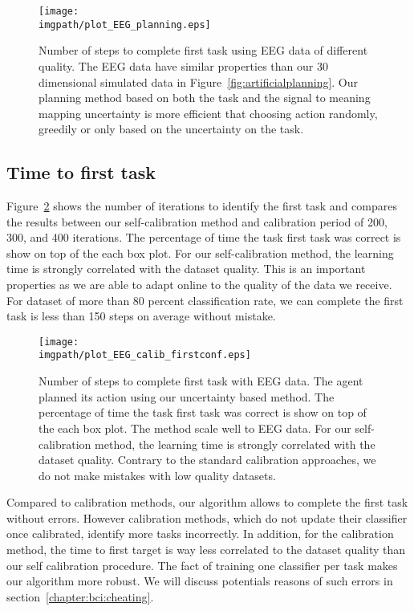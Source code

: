 \begin{figure}[!htbp]
    \centering
    \texttt{[image: \\imgpath/plot\_EEG\_planning.eps]}
    \caption{Number of steps to complete first task using EEG data of different quality. The EEG data have similar properties than our 30 dimensional simulated data in Figure~\ref{fig:artificialplanning}. Our planning method based on both the task and the signal to meaning mapping uncertainty is more efficient that choosing action randomly, greedily or only based on the uncertainty on the task.}
    \label{fig:planningEEG}
\end{figure}

\subsection{Time to first task}

Figure~\ref{fig:firstEEG} shows the number of iterations to identify the first task and compares the results between our self-calibration method and calibration period of 200, 300, and 400 iterations. The percentage of time the task first task was correct is show on top of the each box plot. For our self-calibration method, the learning time is strongly correlated with the dataset quality. This is an important properties as we are able to adapt online to the quality of the data we receive. For dataset of more than 80 percent classification rate, we can complete the first task is less than 150 steps on average without mistake.

\begin{figure}[!htbp]
\centering
\texttt{[image: \\imgpath/plot\_EEG\_calib\_firstconf.eps]}
\caption{Number of steps to complete first task with EEG data. The agent planned its action using our uncertainty based method. The percentage of time the task first task was correct is show on top of the each box plot. The method scale well to EEG data. For our self-calibration method, the learning time is strongly correlated with the dataset quality. Contrary to the standard calibration approaches, we do not make mistakes with low quality datasets.}
\label{fig:firstEEG}
\end{figure} 

Compared to calibration methods, our algorithm allows to complete the first task without errors. However calibration methods, which do not update their classifier once calibrated, identify more tasks incorrectly. In addition, for the calibration method, the time to first target is way less correlated to the dataset quality than our self calibration procedure. The fact of training one classifier per task makes our algorithm more robust. We will discuss potentials reasons of such errors in section~\ref{chapter:bci:cheating}.

